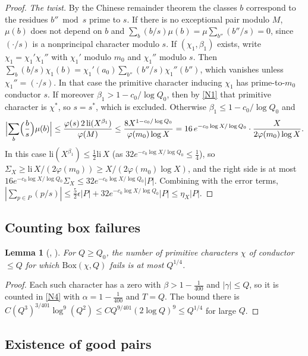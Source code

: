 \documentclass[11pt]{amsart}
\theoremstyle{plain}
\newtheorem{lemma}[theorem]{Lemma}
\theoremstyle{definition}
\numberwithin{equation}{section}
\begin{document}
\begin{proof}
\emph{The twist.} By the Chinese remainder theorem the classes $b$ correspond to the residues
$b''\bmod s$ prime to $s$. If there is no exceptional pair modulo $M$, $\mu(b)$ does not depend on
$b$ and $\sum_b(b/s)\mu(b)=\mu\sum_{b''}(b''/s)=0$, since $(\cdot/s)$ is a nonprincipal character
modulo $s$. If $(\chi_1,\beta_1)$ exists, write $\chi_1=\chi_1'\chi_1''$ with $\chi_1'$ modulo $m_0$
and $\chi_1''$ modulo $s$. Then
$\sum_b(b/s)\chi_1(b)=\chi_1'(a_0)\sum_{b''}(b''/s)\chi_1''(b'')$, which vanishes unless
$\chi_1''=(\cdot/s)$. In that case the primitive character inducing $\chi_1$ has prime-to-$m_0$
conductor $s$. If moreover $\beta_1>1-c_0/\log Q_0$, then by \ref{N1} that primitive character is
$\chi^\ast$, so $s=s^\ast$, which is excluded. Otherwise $\beta_1\le1-c_0/\log Q_0$ and
\[
\Bigl|\sum_b\Bigl(\frac bs\Bigr)\mu(b)\Bigr|\le\frac{\varphi(s)\,2\,\mathrm{li}(X^{\beta_1})}{\varphi(M)}
\le\frac{8X^{1-c_0/\log Q_0}}{\varphi(m_0)\log X}=16\,e^{-c_0\log X/\log Q_0}\cdot\frac{X}{2\varphi(m_0)\log X}.
\]
In this case $\mathrm{li}(X^{\beta_1})\le\frac12\mathrm{li}\,X$ (as $32e^{-c_0\log X/\log Q_0}\le\frac14$),
so $\Sigma_X\ge\mathrm{li}\,X/(2\varphi(m_0))\ge X/(2\varphi(m_0)\log X)$, and the right side is at most
$16e^{-c_0\log X/\log Q_0}\Sigma_X\le32e^{-c_0\log X/\log Q_0}|P|$. Combining with the error terms,
$|\sum_{p\in P}(p/s)|\le\frac52\epsilon|P|+32e^{-c_0\log X/\log Q_0}|P|\le\eta_X|P|$.
\end{proof}

\subsection{Counting box failures}

\begin{lemma}[, ]\label{lem:countbad}
For $Q\ge Q_0$, the number of primitive characters $\chi$ of conductor $\le Q$ for which
$\mathrm{Box}(\chi,Q)$ fails is at most $Q^{1/4}$.
\end{lemma}

\begin{proof}
Each such character has a zero with $\beta>1-\frac1{400}$ and $|\gamma|\le Q$, so it is counted in
\ref{N4} with $\alpha=1-\frac1{400}$ and $T=Q$. The bound there is
$C(Q^3)^{3/401}\log^9(Q^2)\le CQ^{9/401}(2\log Q)^9\le Q^{1/4}$ for large $Q$.
\end{proof}

\subsection{Existence of good pairs}
\end{document}
